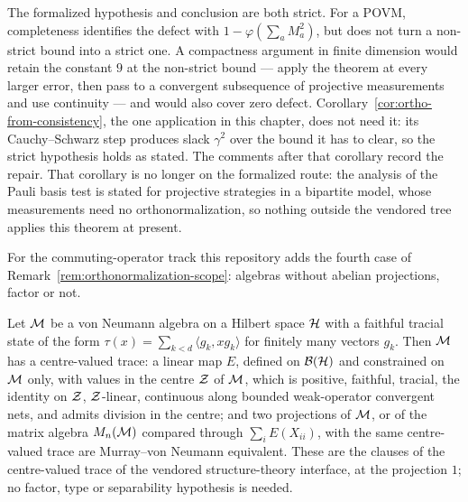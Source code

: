 The formalized hypothesis and conclusion are both strict. For a POVM, completeness
identifies the defect with $1-\varphi(\sum_a M_a^2)$, but does not turn a non-strict
bound into a strict one. A compactness argument in finite dimension would retain the
constant $9$ at the non-strict bound --- apply the theorem at every larger error, then
pass to a convergent subsequence of projective measurements and use continuity --- and
would also cover zero defect. Corollary~\ref{cor:ortho-from-consistency}, the one
application in this chapter, does not need it: its Cauchy--Schwarz step produces slack
$\gamma^2$ over the bound it has to clear, so the strict hypothesis holds as stated. The
comments after that corollary record the repair. That corollary is no longer on the formalized
route: the analysis of the Pauli basis test is stated for projective strategies in a bipartite
model, whose measurements need no orthonormalization, so nothing outside the vendored tree
applies this theorem at present.

For the commuting-operator track this repository adds the fourth case of
Remark~\ref{rem:orthonormalization-scope}: algebras without abelian projections, factor or not.

\begin{lemma}
\label{lem:center-valued-trace}
\leanok
Let $\cal{M}$ be a von Neumann algebra on a Hilbert space $\mH$ with a faithful tracial state
of the form $\tau(x) = \sum_{k < d} \langle g_k, x g_k \rangle$ for finitely many vectors $g_k$.
Then $\cal{M}$ has a centre-valued trace: a linear map $E$, defined on $\cal{B}(\mH)$ and
constrained on $\cal{M}$ only, with values in the centre $\cal{Z}$ of $\cal{M}$, which is
positive, faithful, tracial, the identity on $\cal{Z}$, $\cal{Z}$-linear, continuous along
bounded weak-operator convergent nets, and admits division in the centre; and two projections of
$\cal{M}$, or of the matrix algebra $M_n(\cal{M})$ compared through $\sum_i E(X_{ii})$, with the
same centre-valued trace are Murray--von Neumann equivalent. These are the clauses of the
centre-valued trace of the vendored structure-theory interface, at the projection $1$; no factor,
type or separability hypothesis is needed.
\end{lemma}

